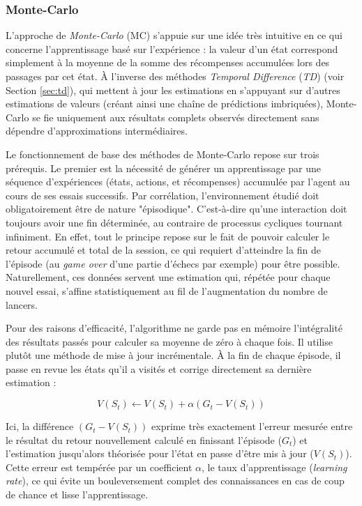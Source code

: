 \subsubsection{Monte-Carlo}

L'approche de \textit{Monte-Carlo} (MC) \parencite{suttonReinforcementLearningIntroduction2018} s'appuie sur une idée très intuitive en ce qui concerne l'apprentissage basé sur l'expérience : la valeur d'un état correspond simplement à la moyenne de la somme des récompenses accumulées lors des passages par cet état. À l'inverse des méthodes \textit{Temporal Difference} (\textit{TD}) (voir Section \ref{sec:td}), qui mettent à jour les estimations en s'appuyant sur d'autres estimations de valeurs (créant ainsi une chaîne de prédictions imbriquées), Monte-Carlo se fie uniquement aux résultats complets observés directement sans dépendre d'approximations intermédiaires.


Le fonctionnement de base des méthodes de Monte-Carlo repose sur trois prérequis. Le premier est la nécessité de générer un apprentissage par une séquence d'expériences (états, actions, et récompenses) accumulée par l'agent au cours de ses essais successifs.
Par corrélation, l'environnement étudié doit obligatoirement être de nature "épisodique". C'est-à-dire qu'une interaction doit toujours avoir une fin déterminée, au contraire de processus cycliques tournant infiniment. En effet, tout le principe repose sur le fait de pouvoir calculer le retour accumulé et total de la session, ce qui requiert d'atteindre la fin de l'épisode (au \textit{game over} d'une partie d'échecs par exemple) pour être possible. Naturellement, ces données servent une estimation qui, répétée pour chaque nouvel essai, s'affine statistiquement au fil de l'augmentation du nombre de lancers.

Pour des raisons d'efficacité, l'algorithme ne garde pas en mémoire l'intégralité des résultats passés pour calculer sa moyenne de zéro à chaque fois. Il utilise plutôt une méthode de mise à jour incrémentale. À la fin de chaque épisode, il passe en revue les états qu'il a visités et corrige directement sa dernière estimation :

\begin{equation}
    V(S_t) \leftarrow V(S_t) + \alpha \left( G_t - V(S_t) \right)
\end{equation}

Ici, la différence $(G_t - V(S_t))$ exprime très exactement l'erreur mesurée entre le résultat du retour nouvellement calculé en finissant l'épisode ($G_t$) et l'estimation jusqu'alors théorisée pour l'état en passe d'être mis à jour ($V(S_t)$). Cette erreur est tempérée par un coefficient $\alpha$, le taux d'apprentissage (\textit{learning rate}), ce qui évite un bouleversement complet des connaissances en cas de coup de chance et lisse l'apprentissage.

